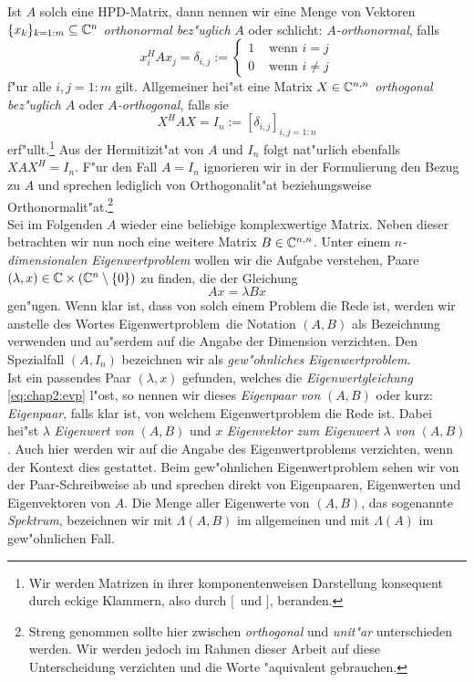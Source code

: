 Ist $A$ solch eine HPD-Matrix,
dann nennen wir eine Menge von Vektoren $\{x_k\}_{k=1:m}\subseteq\mathbb{C}^n$ \emph{orthonormal
bez"uglich} $A$ oder schlicht: \emph{$A$-orthonormal}, falls
\[
x_i^H A x_j = \delta_{i,j} := \begin{cases}
1 & \text{ wenn } i=j \\
0 & \text{ wenn } i\neq j
\end{cases}
\]
f"ur alle $i,j = 1:m$ gilt. Allgemeiner hei"st eine Matrix $X\in\mathbb{C}^{n,n}$ \emph{orthogonal bez"uglich} $A$ oder \emph{$A$-orthogonal}, falls sie
\[
X^H A X = I_n := [\delta_{i,j}]_{i,j=1:n}
\]
erf"ullt.\footnote{Wir werden Matrizen in ihrer komponentenweisen Darstellung konsequent durch eckige Klammern, also durch \glqq$[$\grqq\ und \glqq$]$\grqq, beranden.} Aus der Hermitizit"at von $A$ und $I_n$ folgt nat"urlich ebenfalls $XAX^H = I_n$. F"ur den Fall $A=I_n$ ignorieren wir in der Formulierung den Bezug zu $A$ und sprechen lediglich von Orthogonalit"at beziehungsweise Orthonormalit"at.\footnote{Streng genommen sollte hier zwischen \emph{orthogonal} und \emph{unit"ar} unterschieden werden. Wir werden jedoch im Rahmen dieser Arbeit auf diese Unterscheidung verzichten und die Worte "aquivalent gebrauchen.}\\

Sei im Folgenden $A$ wieder eine beliebige komplexwertige Matrix. Neben dieser betrachten wir nun noch eine weitere Matrix $B\in\mathbb{C}^{n,n}$.
Unter einem \emph{$n$-dimensionalen Eigenwertproblem} wollen wir die Aufgabe verstehen, Paare $(\lambda,x)\in\mathbb{C}\times(\mathbb{C}^n \setminus\{0\})$ zu finden, die der Gleichung
\begin{equation}\label{eq:chap2:evp}
Ax = \lambda Bx
\end{equation}
gen"ugen. Wenn klar ist, dass von solch einem Problem die Rede ist, werden wir anstelle des Wortes \glqq Eigenwertproblem\grqq\ die Notation $(A,B)$ als Bezeichnung verwenden und au"serdem auf die Angabe der Dimension verzichten. Den Spezialfall $(A,I_n)$ bezeichnen wir als \emph{gew"ohnliches Eigenwertproblem}.\\

Ist ein passendes Paar $(\lambda,x)$ gefunden, welches die \emph{Eigenwertgleichung} \eqref{eq:chap2:evp} l"ost, so nennen wir dieses \emph{Eigenpaar von} $(A,B)$ oder kurz: \emph{Eigenpaar}, falls klar ist, von welchem Eigenwertproblem die Rede ist.
Dabei hei"st $\lambda$ \emph{Eigenwert von} $(A,B)$ und $x$ \emph{Eigenvektor zum Eigenwert} $\lambda$ \emph{von} $(A,B)$. Auch hier werden wir auf die Angabe des Eigenwertproblems verzichten, wenn der Kontext dies gestattet.
Beim gew"ohnlichen Eigenwertproblem sehen wir von der Paar-Schreibweise ab und sprechen direkt von Eigenpaaren, Eigenwerten und Eigenvektoren von $A$.
Die Menge aller Eigenwerte von $(A,B)$, das sogenannte \emph{Spektrum}, bezeichnen wir mit $\Lambda(A,B)$ im allgemeinen und mit $\Lambda(A)$ im gew"ohnlichen Fall.\\

